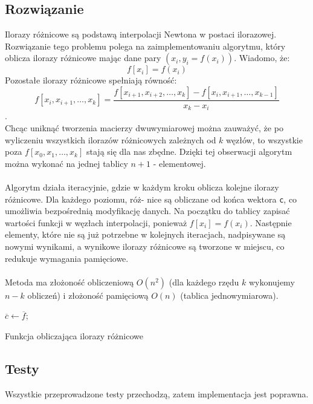 \documentclass{article}
\begin{document}
\subsection{Rozwiązanie}
Ilorazy różnicowe są podstawą interpolacji Newtona w postaci ilorazowej.
Rozwiązanie tego problemu polega na zaimplementowaniu algorytmu, który oblicza ilorazy różnicowe mając dane pary $(x_i, y_i = f(x_i))$.  Wiadomo, że:
\[f[x_i] = f(x_i)\]
Pozostałe ilorazy różnicowe spełniają równość:
\[f[x_i, x_{i+1}, \dots, x_k] = \frac{f[x_{i+1}, x_{i+2}, \dots, x_k] - f[x_i, x_{i+1}, \dots, x_{k-1}]}{x_k - x_i}\].
\\ Chcąc uniknąć tworzenia macierzy dwuwymiarowej można zauważyć, że po wyliczeniu wszystkich ilorazów różnicowych zależnych od $k$ węzłów, to wszystkie poza $f[x_0, x_1, \dots, x_k]$ stają się dla nas zbędne. Dzięki tej obserwacji algorytm można wykonać na jednej tablicy $n+1$ - elementowej.
\\ \\ Algorytm działa iteracyjnie, gdzie w każdym kroku oblicza kolejne ilorazy różnicowe. Dla każdego poziomu, róż-
nice są obliczane od końca wektora \texttt{c}, co umożliwia bezpośrednią modyfikację danych. Na początku do tablicy zapisać wartości funkcji w węzłach interpolacji, ponieważ $f[x_i] = f(x_i)$. Następnie elementy, które nie są już potrzebne w kolejnych iteracjach, nadpisywane są nowymi wynikami, a wynikowe ilorazy różnicowe są tworzone w miejscu, co redukuje wymagania pamięciowe.
\\
\\ Metoda ma złożoność obliczeniową $O(n^2)$ (dla każdego rzędu $k$ wykonujemy $n - k$ obliczeń) i złożoność pamięciową $O(n)$ (tablica jednowymiarowa). 
\\ 
\begin{algorithm}[H]
\SetAlgoLined
{}
$\overline{c} \gets \overline{f}$;


\caption{Funkcja obliczająca ilorazy różnicowe}
\end{algorithm}
\subsection{Testy}
Wszystkie przeprowadzone testy przechodzą, zatem implementacja jest poprawna.
\end{document}
